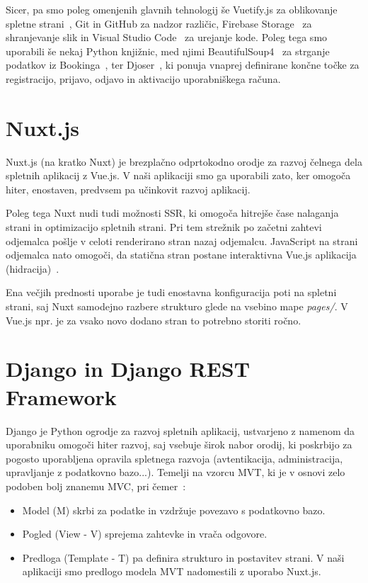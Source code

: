 \documentclass[a4paper,12pt,openright]{book}
\begin{document}
Sicer, pa smo poleg omenjenih glavnih tehnologij še Vuetify.js za oblikovanje spletne strani~\cite{vuetify},
Git \cite{git} in GitHub \cite{github} za nadzor različic, Firebase Storage~\cite{firebase} za shranjevanje slik in Visual Studio Code~\cite{vscode} za urejanje kode.
Poleg tega smo uporabili še nekaj Python knjižnic, med njimi BeautifulSoup4~\cite{bs4} za strganje podatkov iz Bookinga~\cite{bookingapi}, ter Djoser~\cite{djoser}, ki ponuja vnaprej definirane končne točke za registracijo, prijavo, odjavo in aktivacijo uporabniškega računa. 

\section{Nuxt.js}
Nuxt.js (na kratko Nuxt) je brezplačno odprtokodno orodje za razvoj čelnega dela spletnih aplikacij z Vue.js.
V naši aplikaciji smo ga uporabili zato, ker omogoča hiter, enostaven, predvsem pa učinkovit razvoj aplikacij. 

Poleg tega Nuxt nudi tudi možnosti SSR, ki omogoča hitrejše čase nalaganja strani in optimizacijo spletnih strani.
Pri tem strežnik po začetni zahtevi odjemalca pošlje v celoti renderirano stran nazaj odjemalcu.
JavaScript na strani odjemalca nato omogoči, da statična stran postane interaktivna Vue.js aplikacija (hidracija)~\cite{hydration}.

Ena večjih prednosti uporabe je tudi enostavna konfiguracija poti na spletni strani, saj Nuxt samodejno razbere strukturo glede na vsebino mape \textit{pages/}. 
V Vue.js npr. je za vsako novo dodano stran to potrebno storiti ročno.

\section{Django in Django REST Framework}
Django je Python ogrodje za razvoj spletnih aplikacij, ustvarjeno z namenom da uporabniku omogoči hiter razvoj, saj vsebuje širok nabor orodij, ki poskrbijo za pogosto uporabljena opravila spletnega razvoja (avtentikacija, administracija, upravljanje z podatkovno bazo...).
Temelji na vzorcu MVT, ki je v osnovi zelo podoben bolj znanemu MVC, pri čemer~\cite{mvt}:
\begin{itemize}
    \item Model (M) skrbi za podatke in vzdržuje povezavo s podatkovno bazo.
    \item Pogled (View - V) sprejema zahtevke in vrača odgovore.
    \item Predloga (Template - T) pa definira strukturo in postavitev strani. V naši aplikaciji smo predlogo modela MVT nadomestili z uporabo Nuxt.js.
\end{itemize}
\end{document}
